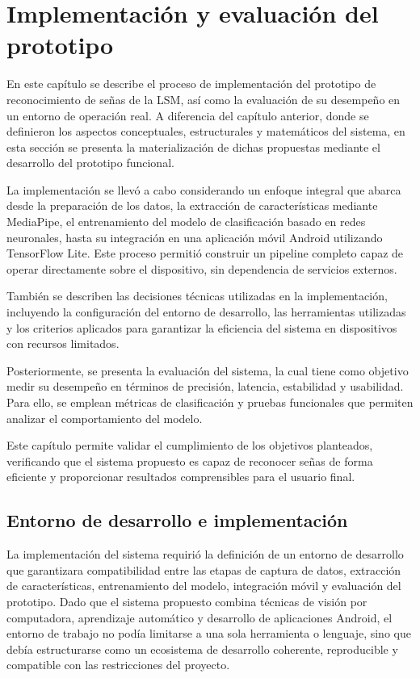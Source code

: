 	\section{Implementación y evaluación del prototipo}
	
	En este capítulo se describe el proceso de implementación del prototipo de reconocimiento de señas de la LSM, así como la evaluación de su desempeño en un entorno de operación real. A diferencia del capítulo anterior, donde se definieron los aspectos conceptuales, estructurales y matemáticos del sistema, en esta sección se presenta la materialización de dichas propuestas mediante el desarrollo del prototipo funcional.
	
	La implementación se llevó a cabo considerando un enfoque integral que abarca desde la preparación de los datos, la extracción de características mediante MediaPipe, el entrenamiento del modelo de clasificación basado en redes neuronales, hasta su integración en una aplicación móvil Android utilizando TensorFlow Lite. Este proceso permitió construir un pipeline completo capaz de operar directamente sobre el dispositivo, sin dependencia de servicios externos.
	
	También se describen las decisiones técnicas utilizadas en la implementación, incluyendo la configuración del entorno de desarrollo, las herramientas utilizadas y los criterios aplicados para garantizar la eficiencia del sistema en dispositivos con recursos limitados.
	
	Posteriormente, se presenta la evaluación del sistema, la cual tiene como objetivo medir su desempeño en términos de precisión, latencia, estabilidad y usabilidad. Para ello, se emplean métricas de clasificación y pruebas funcionales que permiten analizar el comportamiento del modelo.
	
	Este capítulo permite validar el cumplimiento de los objetivos planteados, verificando que el sistema propuesto es capaz de reconocer señas de forma eficiente y proporcionar resultados comprensibles para el usuario final.
	
	\subsection{Entorno de desarrollo e implementación}
	
	La implementación del sistema requirió la definición de un entorno de desarrollo que garantizara compatibilidad entre las etapas de captura de datos, extracción de características, entrenamiento del modelo, integración móvil y evaluación del prototipo. Dado que el sistema propuesto combina técnicas de visión por computadora, aprendizaje automático y desarrollo de aplicaciones Android, el entorno de trabajo no podía limitarse a una sola herramienta o lenguaje, sino que debía estructurarse como un ecosistema de desarrollo coherente, reproducible y compatible con las restricciones del proyecto.
	
